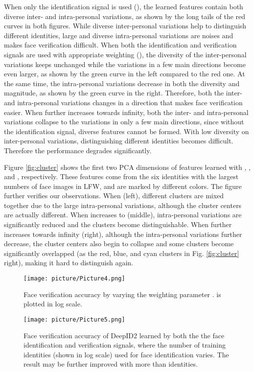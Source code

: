 \documentclass{article} \usepackage{nips14submit_e,times}
\begin{document}
When only the identification signal is used (), the learned features contain both diverse inter- and intra-personal variations, as shown by the long tails of the red curves in both figures. While diverse inter-personal variations help to distinguish different identities, large and diverse intra-personal variations are noises and makes face verification difficult. When both the identification and verification signals are used with appropriate weighting (), the diversity of the inter-personal variations keeps unchanged while the variations in a few main directions become even larger, as shown by the green curve in the left compared to the red one. At the same time, the intra-personal variations decrease in both the diversity and magnitude, as shown by the green curve in the right. Therefore, both the inter- and intra-personal variations changes in a direction that makes face verification easier. When  further increases towards infinity, both the inter- and intra-personal variations collapse to the variations in only a few main directions, since without the identification signal, diverse features cannot be formed. With low diversity on inter-personal variations, distinguishing different identities becomes difficult. Therefore the performance degrades significantly.

Figure \ref{fig:cluster} shows the first two PCA dimensions of features learned with , , and , respectively. These features come from the six identities with the largest numbers of face images in LFW, and are marked by different colors. The figure further verifies our observations. When  (left), different clusters are mixed together due to the large intra-personal variations, although the cluster centers are actually different. When  increases to  (middle), intra-personal variations are significantly reduced and the clusters become distinguishable. When  further increases towards infinity (right), although the intra-personal variations further decrease, the cluster centers also begin to collapse and some clusters become significantly overlapped (as the red, blue, and cyan clusters in Fig. \ref{fig:cluster} right), making it hard to distinguish again.

\begin{figure}[t]
\begin{minipage}[t]{0.5\linewidth}
\centering
  \texttt{[image: picture/Picture4.png]}
  \vspace{-0.25in}
  \caption{Face verification accuracy by varying the weighting parameter .  is plotted in log scale.}
  \label{fig:iv}
\end{minipage}
\hspace{0.2cm}
\begin{minipage}[t]{0.5\linewidth}
 \centering
  \texttt{[image: picture/Picture5.png]}
  \vspace{-0.25in}
  \caption{Face verification accuracy of DeepID2 learned by both the the face identification and verification signals, where the number of training identities (shown in log scale) used for face identification varies. The result may be further improved with more than  identities.}
  \label{fig:classnum}
\end{minipage}
\end{figure}
\end{document}
